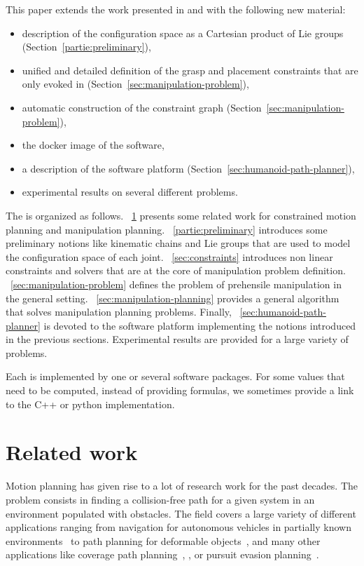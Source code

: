 This paper extends the work presented in \cite{mirabel-iros2016} and \cite{MirLam2018} with the following new material:
\begin{itemize}
\item description of the configuration space as a Cartesian product of Lie groups (Section~\ref{partie:preliminary}),
\item unified and detailed definition of the grasp and placement constraints that are only evoked in \cite{mirabel-iros2016} (Section~\ref{sec:manipulation-problem}),
\item automatic construction of the constraint graph (Section~\ref{sec:manipulation-problem}),
\item the docker image of the software,
\item a description of the software platform (Section~\ref{sec:humanoid-path-planner}),
\item experimental results on several different problems.
\end{itemize}

The \paper is organized as follows. \Partie~\ref{sec:related-work} presents some related work for constrained motion planning and manipulation planning.
\Partie~\ref{partie:preliminary} introduces some preliminary notions like kinematic chains and Lie groups that are used to model the configuration space of each joint. \Partie~\ref{sec:constraints} introduces non linear constraints and solvers that are at the core of manipulation problem definition. \Partie~\ref{sec:manipulation-problem} defines the problem of prehensile manipulation in the general setting. \Partie~\ref{sec:manipulation-planning} provides a general algorithm that solves manipulation planning problems. Finally, \partie~\ref{sec:humanoid-path-planner} is devoted to the software platform implementing the notions introduced in the previous sections. Experimental results are provided for a large variety of problems.

Each \partie is implemented by one or several software packages. For some values that need to be computed, instead of providing formulas, we sometimes provide a link to the C++ or python implementation.

\section{Related work}\label{sec:related-work}

Motion planning has given rise to a lot of research work for the past decades.
The problem consists in finding a collision-free path for a given system in
an environment populated with obstacles. The field covers a large variety of
different applications ranging from navigation for autonomous vehicles in
partially known environments~\cite{DarpaUrbanChallenge} to path planning for
deformable objects~\cite{LamKav2001}, \cite{RouFerTai2020} and many other applications like coverage path planning~\cite{coverage2001}, \cite{coverage2013}, or pursuit evasion planning~\cite{pursuit-evasion1999}.

